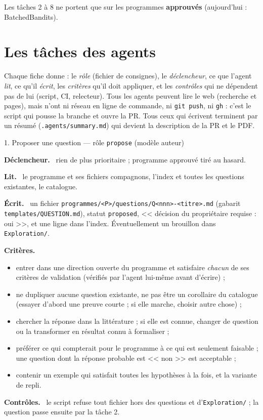\documentclass[11pt,a4paper]{article}
\newcommand{\cmd}[1]{\texttt{#1}}
\newcommand{\rub}[1]{\par\smallskip\textsf{\textbf{#1.}}~}
\begin{document}
Les tâches 2 à 8 ne portent que sur les programmes \textbf{approuvés} (aujourd'hui : BatchedBandits).

\section{Les tâches des agents}

Chaque fiche donne : le \emph{rôle} (fichier de consignes), le \emph{déclencheur}, ce que l'agent
\emph{lit}, ce qu'il \emph{écrit}, les \emph{critères} qu'il doit appliquer, et les \emph{contrôles}
qui ne dépendent pas de lui (script, CI, relecteur). Tous les agents peuvent lire le web (recherche et
pages), mais n'ont ni réseau en ligne de commande, ni \cmd{git push}, ni \cmd{gh} : c'est le script qui
pousse la branche et ouvre la PR. Tous ceux qui écrivent terminent par un résumé
(\cmd{.agents/summary.md}) qui devient la description de la PR et le PDF.

\begin{tache}{1. Proposer une question --- rôle \cmd{propose} (modèle auteur)}
\rub{Déclencheur} rien de plus prioritaire ; programme approuvé tiré au hasard.
\rub{Lit} le programme et ses fichiers compagnons, l'index et toutes les questions existantes, le
catalogue.
\rub{Écrit} un fichier \cmd{programmes/<P>/questions/Q<nnn>-<titre>.md} (gabarit
\cmd{templates/QUESTION.md}), statut \cmd{proposed}, << décision du propriétaire requise : oui >>, et une
ligne dans l'index. Éventuellement un brouillon dans \cmd{Exploration/}.
\rub{Critères}
\begin{itemize}
\item entrer dans une direction ouverte du programme et satisfaire \emph{chacun} de ses critères de
  validation (vérifiés par l'agent lui-même avant d'écrire) ;
\item ne dupliquer aucune question existante, ne pas être un corollaire du catalogue (essayer d'abord
  une preuve courte ; si elle marche, choisir autre chose) ;
\item chercher la réponse dans la littérature ; si elle est connue, changer de question ou la
  transformer en résultat connu à formaliser ;
\item préférer ce qui compterait pour le programme à ce qui est seulement faisable ; une question
  dont la réponse probable est << non >> est acceptable ;
\item contenir un exemple qui satisfait toutes les hypothèses à la fois, et la variante de repli.
\end{itemize}
\rub{Contrôles} le script refuse tout fichier hors des questions et d'\cmd{Exploration/} ; la question
passe ensuite par la tâche 2.
\end{tache}
\end{document}

